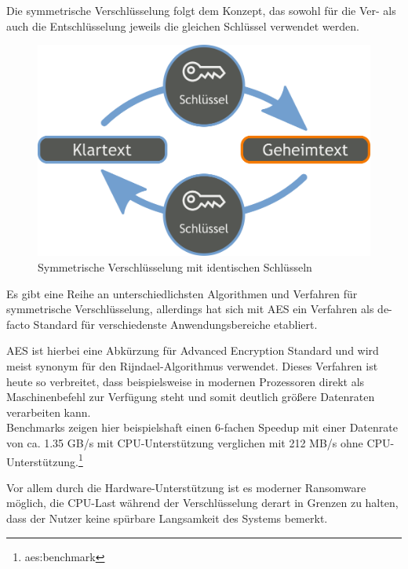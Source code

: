 \label{sec:sym_verschl}

Die symmetrische Verschlüsselung folgt dem Konzept, das sowohl für die Ver- als auch die Entschlüsselung jeweils die gleichen Schlüssel verwendet werden.

\begin{figure}[h!]
	\centering
	\includegraphics[width=\linewidth]{img/SymKrypto.png}
	\caption{Symmetrische Verschlüsselung mit identischen Schlüsseln}
	\label{fig:sym_verschl}
	\end{figure}

Es gibt eine Reihe an unterschiedlichsten Algorithmen und Verfahren für symmetrische Verschlüsselung, allerdings hat sich mit \textsc{AES} ein Verfahren als de-facto Standard für verschiedenste Anwendungsbereiche etabliert.

AES ist hierbei eine Abkürzung für Advanced Encryption Standard und wird meist synonym für den Rijndael-Algorithmus verwendet. Dieses Verfahren ist heute so verbreitet, dass beispielsweise in modernen Prozessoren direkt als Maschinenbefehl zur Verfügung steht und somit deutlich größere Datenraten verarbeiten kann. \\
Benchmarks zeigen hier beispielshaft einen 6-fachen Speedup mit einer Datenrate von ca. 1.35 GB/s mit CPU-Unterstützung verglichen mit 212 MB/s ohne
CPU-Unterstützung.\footnote{aes:benchmark}

Vor allem durch die Hardware-Unterstützung ist es moderner Ransomware möglich, die CPU-Last während der Verschlüsselung derart in Grenzen zu halten, dass der Nutzer keine spürbare Langsamkeit des Systems bemerkt.


